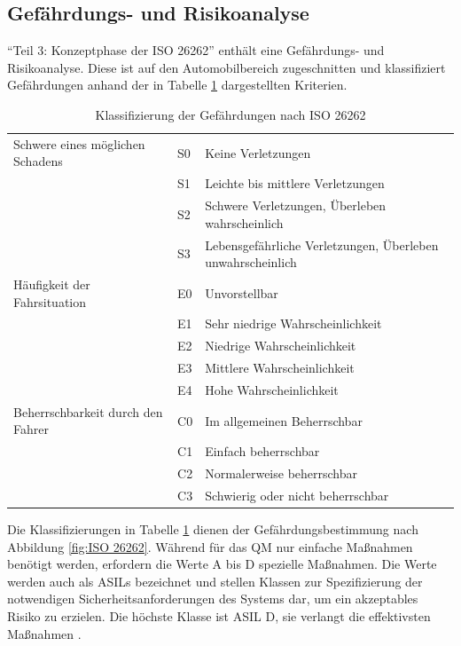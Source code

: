 \subsection{Gefährdungs- und Risikoanalyse}
\enquote{Teil 3: Konzeptphase der ISO 26262} enthält eine Gefährdungs- und Risikoanalyse. Diese ist auf den Automobilbereich zugeschnitten und klassifiziert Gefährdungen anhand der in Tabelle \ref{tab:Kategorisierung nach ISO 26262} dargestellten Kriterien.

\begin{table}[htpb]
	\scriptsize
	\caption[Klassifizierung der Gefährdungen nach ISO 26262]{Klassifizierung der Gefährdungen nach ISO 26262 \parencite[S. 95]{Hillenbrand.2012}}\label{tab:Kategorisierung nach ISO 26262}
	\centering
	\begin{tabular}{l l p{7cm}}
		\toprule
		Schwere eines möglichen Schadens & S0 & Keine Verletzungen\\
		& S1 & Leichte bis mittlere Verletzungen\\
		& S2 & Schwere Verletzungen, Überleben wahrscheinlich\\
		& S3 & Lebensgefährliche Verletzungen, Überleben unwahrscheinlich\\
		\midrule
		Häufigkeit der Fahrsituation & E0 & Unvorstellbar\\
		& E1 & Sehr niedrige Wahrscheinlichkeit\\
		& E2 & Niedrige Wahrscheinlichkeit\\
		& E3 & Mittlere Wahrscheinlichkeit\\
		& E4 & Hohe Wahrscheinlichkeit\\
		\midrule
		Beherrschbarkeit durch den Fahrer & C0 & Im allgemeinen Beherrschbar\\
		& C1 & Einfach beherrschbar\\
		& C2 & Normalerweise beherrschbar\\
		& C3 & Schwierig oder nicht beherrschbar\\
		\bottomrule
	\end{tabular}
\end{table}

Die Klassifizierungen in Tabelle \ref{tab:Kategorisierung nach ISO 26262} dienen der Gefährdungsbestimmung nach Abbildung \ref{fig:ISO 26262}. Während für das \ac{QM} nur einfache Maßnahmen benötigt werden, erfordern die Werte A bis D spezielle Maßnahmen. Die Werte werden auch als \acp{ASIL} bezeichnet und stellen Klassen zur Spezifizierung der notwendigen Sicherheitsanforderungen des Systems dar, um ein akzeptables Risiko zu erzielen. Die höchste Klasse ist \acs{ASIL} D, sie verlangt die effektivsten Maßnahmen \parencite[S.94ff]{Hillenbrand.2012}.

